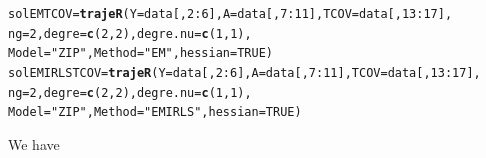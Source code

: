 \documentclass{article}\usepackage[]{graphicx}\usepackage[]{color}
\makeatletter
\newcommand{\hlnum}[1]{\textcolor[rgb]{0.686,0.059,0.569}{#1}}%
\newcommand{\hlstr}[1]{\textcolor[rgb]{0.192,0.494,0.8}{#1}}%
\newcommand{\hlopt}[1]{\textcolor[rgb]{0,0,0}{#1}}%
\newcommand{\hlstd}[1]{\textcolor[rgb]{0.345,0.345,0.345}{#1}}%
\newcommand{\hlkwb}[1]{\textcolor[rgb]{0.69,0.353,0.396}{#1}}%
\newcommand{\hlkwc}[1]{\textcolor[rgb]{0.333,0.667,0.333}{#1}}%
\newcommand{\hlkwd}[1]{\textcolor[rgb]{0.737,0.353,0.396}{\textbf{#1}}}%
\newenvironment{kframe}{%
 \def\at@end@of@kframe{}%
 \ifinner\ifhmode%
  \def\at@end@of@kframe{\end{minipage}}%
  \begin{minipage}{\columnwidth}%
 \fi\fi%
 \def\FrameCommand##1{\hskip\@totalleftmargin \hskip-\fboxsep
 \colorbox{shadecolor}{##1}\hskip-\fboxsep
     \hskip-\linewidth \hskip-\@totalleftmargin \hskip\columnwidth}%
 \MakeFramed {\advance\hsize-\width
   \@totalleftmargin\z@ \linewidth\hsize
   \@setminipage}}%
 {\par\unskip\endMakeFramed%
 \at@end@of@kframe}
\newenvironment{knitrout}{}{} %
\makeatother
\begin{document}
\begin{knitrout}
\color{fgcolor}\begin{kframe}
\begin{alltt}
\hlstd{solEMTCOV} \hlkwb{=} \hlkwd{trajeR}\hlstd{(}\hlkwc{Y} \hlstd{= data[,}\hlnum{2}\hlopt{:}\hlnum{6}\hlstd{],} \hlkwc{A} \hlstd{= data[,}\hlnum{7}\hlopt{:}\hlnum{11}\hlstd{],} \hlkwc{TCOV} \hlstd{= data[,}\hlnum{13}\hlopt{:}\hlnum{17}\hlstd{],}
                   \hlkwc{ng} \hlstd{=} \hlnum{2}\hlstd{,} \hlkwc{degre}\hlstd{=}\hlkwd{c}\hlstd{(}\hlnum{2}\hlstd{,}\hlnum{2}\hlstd{),} \hlkwc{degre.nu} \hlstd{=} \hlkwd{c}\hlstd{(}\hlnum{1}\hlstd{,}\hlnum{1}\hlstd{),}
                   \hlkwc{Model}\hlstd{=}\hlstr{"ZIP"}\hlstd{,} \hlkwc{Method} \hlstd{=} \hlstr{"EM"}\hlstd{,} \hlkwc{hessian} \hlstd{=} \hlnum{TRUE}\hlstd{)}
\hlstd{solEMIRLSTCOV} \hlkwb{=} \hlkwd{trajeR}\hlstd{(}\hlkwc{Y} \hlstd{= data[,}\hlnum{2}\hlopt{:}\hlnum{6}\hlstd{],} \hlkwc{A} \hlstd{= data[,}\hlnum{7}\hlopt{:}\hlnum{11}\hlstd{],} \hlkwc{TCOV} \hlstd{= data[,}\hlnum{13}\hlopt{:}\hlnum{17}\hlstd{],}
                       \hlkwc{ng} \hlstd{=} \hlnum{2}\hlstd{,} \hlkwc{degre}\hlstd{=}\hlkwd{c}\hlstd{(}\hlnum{2}\hlstd{,}\hlnum{2}\hlstd{),} \hlkwc{degre.nu} \hlstd{=} \hlkwd{c}\hlstd{(}\hlnum{1}\hlstd{,}\hlnum{1}\hlstd{),}
                       \hlkwc{Model}\hlstd{=}\hlstr{"ZIP"}\hlstd{,} \hlkwc{Method} \hlstd{=} \hlstr{"EMIRLS"}\hlstd{,} \hlkwc{hessian} \hlstd{=} \hlnum{TRUE}\hlstd{)}
\end{alltt}
\end{kframe}
\end{knitrout}
We have
\end{document}
